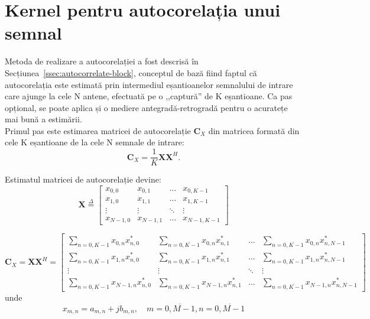 
\section{Kernel pentru autocorelația unui semnal}
\label{sec:kernel-autocorr}

Metoda de realizare a autocorelației a fost descrisă în
Secțiunea~\ref{ssec:autocorrelate-block}, conceptul de bază fiind faptul că
autocorelația este estimată prin intermediul eșantioanelor semnalului de intrare
care ajunge la cele N antene, efectuată pe o ,,captură'' de K eșantioane. Ca pas
opțional, se poate aplica și o mediere antegradă-retrogradă pentru o acuratețe
mai bună a estimării. \\

Primul pas este estimarea matricei de autocorelație $\bm{C}_X$ din matricea
formată din cele K eșantioane de la cele N semnale de intrare:
\begin{equation}
\bm{C}_X = \frac{1}{K}\bm{X}\bm{X}^H.
\end{equation}

Estimatul matricei de autocorelație devine:
\begin{equation}
    \bm{X}
    \overset{\Delta}{=}
    \begin{bmatrix}
        x_{0,0}   &   x_{0,1}   &   \hdots   &   x_{0,K-1} \\
        x_{1,0}   &   x_{1,1}   &   \hdots   &   x_{1,K-1} \\
        \vdots    &   \vdots    &   \ddots   &   \vdots    \\
        x_{N-1,0} &   x_{N-1,1} &   \hdots   &   x_{N-1,K-1}
    \end{bmatrix}
\end{equation}

\begin{equation}
    \bm{C}_X
    = \bm{X} \bm{X}^H = 
    \begin{bmatrix}
        \displaystyle{\sum_{n=\overline{0, K-1}} x_{0,n}x_{n,0}^*} & 
        \displaystyle{\sum_{n=\overline{0, K-1}} x_{0,n}x_{n,1}^*} & 
        \hdots &
        \displaystyle{\sum_{n=\overline{0, K-1}} x_{0,n}x_{n,N-1}^*} \\
        \displaystyle{\sum_{n=\overline{0, K-1}} x_{1,n}x_{n,0}^*} & 
        \displaystyle{\sum_{n=\overline{0, K-1}} x_{1,n}x_{n,1}^*} & 
        \hdots &
        \displaystyle{\sum_{n=\overline{0, K-1}} x_{1,n}x_{n,N-1}^*} \\
        \vdots & \vdots & \ddots & \vdots \\
        \displaystyle{\sum_{n=\overline{0, K-1}} x_{N-1,n}x_{n,0}^*} & 
        \displaystyle{\sum_{n=\overline{0, K-1}} x_{N-1,n}x_{n,1}^*} & 
        \hdots &
        \displaystyle{\sum_{n=\overline{0, K-1}} x_{N-1,n}x_{n,N-1}^*}
    \end{bmatrix}
\end{equation}
unde
\begin{equation}
x_{m,n} = a_{m,n} + jb_{m,n}, \quad m = \overline{0, M-1}, n = \overline{0, M-1}
\end{equation}


